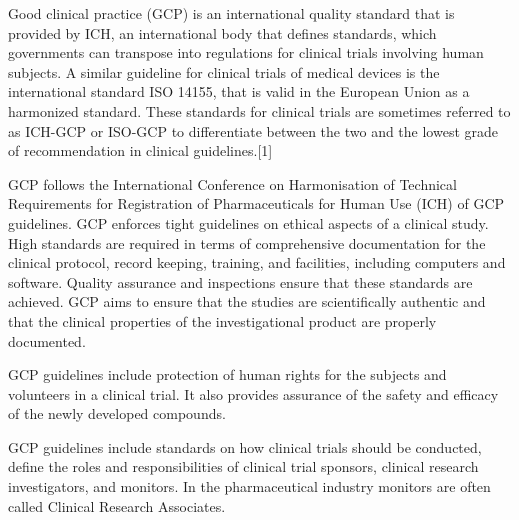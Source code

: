 Good clinical practice (GCP) is an international quality standard that is provided by ICH, an international body that defines standards, which governments can transpose into regulations for clinical trials involving human subjects. A similar guideline for clinical trials of medical devices is the international standard ISO 14155, that is valid in the European Union as a harmonized standard. These standards for clinical trials are sometimes referred to as ICH-GCP or ISO-GCP to differentiate between the two and the lowest grade of recommendation in clinical guidelines.[1]

GCP follows the International Conference on Harmonisation of Technical Requirements for Registration of Pharmaceuticals for Human Use (ICH) of GCP guidelines. GCP enforces tight guidelines on ethical aspects of a clinical study. High standards are required in terms of comprehensive documentation for the clinical protocol, record keeping, training, and facilities, including computers and software. Quality assurance and inspections ensure that these standards are achieved. GCP aims to ensure that the studies are scientifically authentic and that the clinical properties of the investigational product are properly documented.

GCP guidelines include protection of human rights for the subjects and volunteers in a clinical trial. It also provides assurance of the safety and efficacy of the newly developed compounds.

GCP guidelines include standards on how clinical trials should be conducted, define the roles and responsibilities of clinical trial sponsors, clinical research investigators, and monitors. In the pharmaceutical industry monitors are often called Clinical Research Associates.
